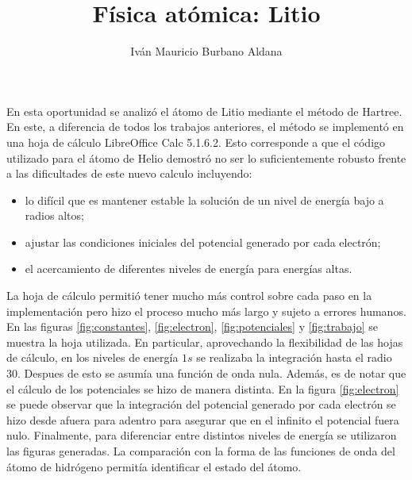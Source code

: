 \documentclass[a4paper]{article}
\title{Física atómica: Litio}
\author{Iván Mauricio Burbano Aldana}
\begin{document}
\maketitle

En esta oportunidad se analizó el átomo de Litio mediante el método de Hartree. En este, a diferencia de todos los trabajos anteriores, el método se implementó en una hoja de cálculo LibreOffice Calc 5.1.6.2. Esto corresponde a que el código utilizado para el átomo de Helio demostró no ser lo suficientemente robusto frente a las dificultades de este nuevo calculo incluyendo:

\begin{itemize}

\item lo difícil que es mantener estable la solución de un nivel de energía bajo a radios altos;
\item ajustar las condiciones iniciales del potencial generado por cada electrón;
\item el acercamiento de diferentes niveles de energía para energías altas.

\end{itemize}

La hoja de cálculo permitió tener mucho más control sobre cada paso en la implementación pero hizo el proceso mucho más largo y sujeto a errores humanos. En las figuras \ref{fig:constantes}, \ref{fig:electron}, \ref{fig:potenciales} y \ref{fig:trabajo} se muestra la hoja utilizada. En particular, aprovechando la flexibilidad de las hojas de cálculo, en los niveles de energía $1s$ se realizaba la integración hasta el radio $30$. Despues de esto se asumía una función de onda nula. Además, es de notar que el cálculo de los potenciales se hizo de manera distinta. En la figura \ref{fig:electron} se puede observar que la integración del potencial generado por cada electrón se hizo desde afuera para adentro para asegurar que en el infinito el potencial fuera nulo. Finalmente, para diferenciar entre distintos niveles de energía se utilizaron las figuras generadas. La comparación con la forma de las funciones de onda del átomo de hidrógeno permitía identificar el estado del átomo.   
\end{document}
